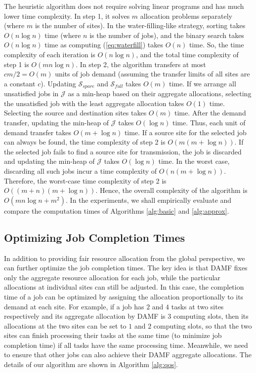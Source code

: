 The heuristic algorithm does not require solving linear programs and has much lower time complexity. In step 1, it solves $m$ allocation problems separately (where $m$ is the number of sites). In the water-filling-like strategy, sorting takes $O(n \log n)$ time (where $n$ is the number of jobs), and the binary search takes $O(n \log n)$ time as computing (\ref{eq:waterfill}) takes $O(n)$ time. So, the time complexity of each iteration is $O(n \log n)$, and the total time complexity of step 1 is $O(m n \log n)$. In step 2, the algorithm transfers at most $cm/2 = O(m)$ units of job demand (assuming the transfer limits of all sites are a constant $c$). Updating $\mathcal{S}_{spare}$ and $\mathcal{S}_{full}$ takes $O(m)$ time. If we arrange all unsatisfied jobs in $\mathcal{J}$ as a min-heap based on their aggregate allocations, selecting the unsatisfied job with the least aggregate allocation takes $O(1)$ time. Selecting the source and destination sites takes $O(m)$ time. After the demand transfer, updating the min-heap of $\mathcal{J}$ takes $O(\log n)$ time.
Thus, each unit of demand transfer takes $O(m+\log n)$ time. If a source site for the selected job can always be found, the time complexity of step 2 is $O(m(m+\log n))$. If the selected job fails to find a source site for transmission, the job is discarded and updating the min-heap of $\mathcal{J}$ takes $O(\log n)$ time. In the worst case, discarding all such jobs incur a time complexity of $O(n (m + \log n))$. Therefore, the worst-case time complexity of step 2 is $O((m+n) (m+\log n))$. Hence, the overall complexity of the algorithm is $O(m n \log n + m^2)$. In the experiments, we shall empirically evaluate and compare the computation times of Algorithms \ref{alg:basic} and \ref{alg:approx}.

\subsection{Optimizing Job Completion Times}
In addition to providing fair resource allocation from the global perspective, we can further optimize the job completion times. The key idea is that DAMF fixes only the aggregate resource allocation for each job, while the particular allocations at individual sites can still be adjusted. In this case, the completion time of a job can be optimized by assigning the allocation proportionally to its demand at each site. For example, if a job has $2$ and $4$ tasks at two sites respectively and its aggregate allocation by DAMF is $3$ computing slots, then its allocations at the two sites can be set to $1$ and $2$ computing slots, so that the two sites can finish processing their tasks at the same time (to minimize job completion time) if all tasks have the same processing time. Meanwhile, we need to ensure that other jobs can also achieve their DAMF aggregate allocations. The details of our algorithm are shown in Algorithm \ref{alg:qos}.


